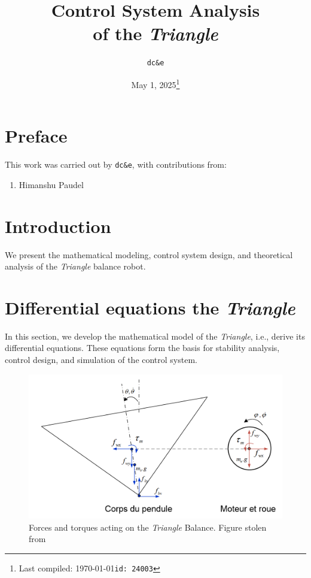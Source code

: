 \documentclass{article}
\title{Control System Analysis\\of the \textit{Triangle}}
\author{\texttt{dc\&e}}
\date{May 1, 2025\footnote{Last compiled: \today\hfill\texttt{id: 24003}}}
\begin{document}
\maketitle

\tableofcontents


\newpage

\section*{Preface}

This work was carried out by \texttt{dc\&e}, with contributions from:

\begin{enumerate}
  \item Himanshu Paudel
\end{enumerate}

\newpage

\section{Introduction}

We present the mathematical modeling, control system design, and theoretical analysis of the \textit{Triangle} balance robot.

\section{Differential equations the \textit{Triangle}}

In this section, we develop the mathematical model of the \textit{Triangle}, i.e., derive its differential equations. These equations form the basis for stability analysis, control design, and simulation of the control system.

\begin{figure}[ht]
  \centering
  \includegraphics[scale=0.24]{triangle.png}
  \caption{Forces and torques acting on the \textit{Triangle} Balance. Figure stolen from \cite{ipendulum}}
  \label{fig_triangle}
\end{figure}
\end{document}
